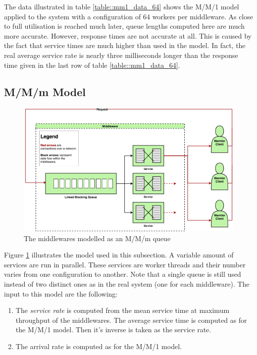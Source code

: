 \documentclass[11pt,a4paper]{article}
\begin{document}
The data illustrated in table \ref{table::mm1_data_64} shows the M/M/1 model applied to the system with a configuration of 64 workers per middleware. As close to full utilisation is reached much later, queue lengths computed here are much more accurate. However, response times are not accurate at all. This is caused by the fact that service times are much higher than used in the model. In fact, the real average service rate is nearly three milliseconds longer than the response time given in the last row of table \ref{table::mm1_data_64}.

\subsection{M/M/m Model}

\begin{figure}[!h]
    \centering
    \includegraphics[width=\textwidth]{processing/graphics/mmn_queue.png}
    \caption{The middlewares modelled as an M/M/m queue}
    \label{png::mmn_queue}
\end{figure}

Figure \ref{png::mmn_queue} illustrates the model used in this subsection. A variable amount of services are run in parallel. These services are worker threads and their number varies from one configuration to another. Note that a single queue is still used instead of two distinct ones as in the real system (one for each middleware). The input to this model are the following:

\begin{enumerate}
    \item The \textit{service rate} is computed from the mean service time at maximum throughput of the middlewares. The average service time is computed as for the M/M/1 model. Then it's inverse is taken as the service rate.
    \item The arrival rate is computed as for the M/M/1 model.
\end{enumerate}
\end{document}
